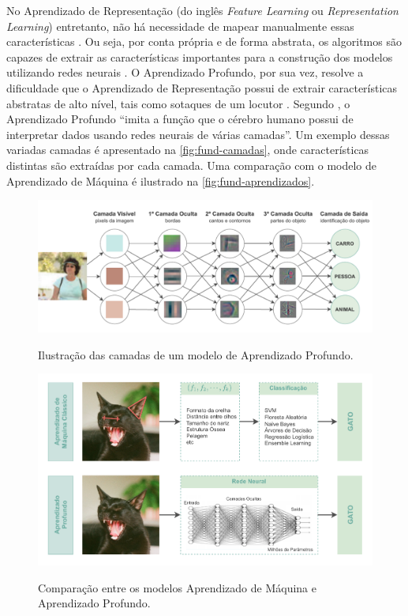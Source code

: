 No Aprendizado de Representação (do inglês \textit{Feature Learning} ou \textit{Representation Learning}) entretanto, não há necessidade de mapear manualmente essas características \cite{ref:Goodfellow-Bengio-Courville}. Ou seja, por conta própria e de forma abstrata, os algoritmos são capazes de extrair as características importantes para a construção dos modelos utilizando redes neurais \cite{ref:Robins} \cite{ref:Lesort}. O Aprendizado Profundo, por sua vez, resolve a dificuldade que o Aprendizado de Representação possui de extrair características abstratas de alto nível, tais como sotaques de um locutor \cite{ref:Goodfellow-Bengio-Courville}. Segundo , o Aprendizado Profundo ``imita a função que o cérebro humano possui de interpretar dados usando redes neurais de várias camadas''. Um exemplo dessas variadas camadas é apresentado na \autoref{fig:fund-camadas}, onde características distintas são extraídas por cada camada. Uma comparação com o modelo de Aprendizado de Máquina é ilustrado na \autoref{fig:fund-aprendizados}.

\begin{figure}[h!] %
  \centering
  \caption{Ilustração das camadas de um modelo de Aprendizado Profundo.}
  \includegraphics[scale=0.8]{img/img-fundamentacao-deep-learning.pdf}
  \label{fig:fund-camadas}
\end{figure}

\begin{figure}[h!] %
  \centering
  \caption{Comparação entre os modelos Aprendizado de Máquina e Aprendizado Profundo.}
  \includegraphics[scale=0.95]{img/img-fundamentacao-aprendizados.pdf}
  \label{fig:fund-aprendizados}
\end{figure}


